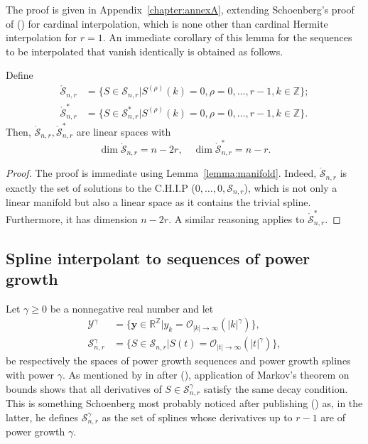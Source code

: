 The proof is given in Appendix~\ref{chapter:annexA}, extending Schoenberg's proof of (\cite[Lemma 1.1, Lecture 
4]{schoenberg_cardinal_1973-1}) for cardinal interpolation, which is none other than cardinal Hermite interpolation for 
$r=1$. An immediate corollary of this lemma for the sequences to be interpolated that vanish identically is obtained as 
follows.

\begin{lem}\label{lemma:linear-space}
  Define 
  \begin{align}\label{def:ringsplines}
    \mathring{\mathscr{S}}_{n, r} &= \{S \in \mathscr{S}_{n,r}| S^{(\rho)}(k) = 0, \rho=0, \ldots, r-1, k \in 
    \mathbb{Z}\}; \\
    \mathring{\mathscr{S}}_{n,r}^* &= \{S \in \mathscr{S}_{n,r}^*| S^{(\rho)}(k) = 0, \rho=0, \ldots, r-1, k \in 
    \mathbb{Z}\}.
  \end{align}
  Then, $\mathring{\mathscr{S}}_{n, r},  \mathring{\mathscr{S}}_{n, r}^*$ are linear spaces with
  \begin{equation}
    \dim \mathring{\mathscr{S}}_{n,r} = n-2r, \quad \dim \mathring{\mathscr{S}}_{n,r}^* = n-r.
  \end{equation}
\end{lem}

\begin{proof}
  The proof is immediate using Lemma~\ref{lemma:manifold}. Indeed, $\mathring{\mathscr{S}}_{n,r}$ is exactly the set of 
  solutions to the C.H.I.P ($0, \ldots, 0, \mathscr{S}_{n,r}$), which is not only a linear manifold but also a linear 
  space as it contains the trivial spline. Furthermore, it has dimension $n-2r$. A similar reasoning applies to 
  $\mathring{\mathscr{S}}_{n,r}^*$.
\end{proof}

\subsection{Spline interpolant to sequences of power growth}

Let $\gamma \geq 0$ be a nonnegative real number and let
\begin{align}
  \mathcal{Y}^{\gamma} &= \{\bm{y} \in \mathbb{R}^{\mathbb{Z}} | y_k = \mathcal{O}_{|k| \to \infty}({|k|}^{\gamma})\},\\
  \mathscr{S}_{n, r}^{\gamma} &= \{S \in \mathscr{S}_{n,r} | S(t) = \mathcal{O}_{|t| \to \infty}({|t|}^{\gamma})\},
\end{align}
be respectively the spaces of power growth sequences and power growth splines with power $\gamma$.  As mentioned by in 
after (\cite[(2.1)]{schoenberg_cardinal_1973-1}), application of Markov's theorem on bounds shows that all derivatives 
of $S \in \mathscr{S}_{n,r}^{\gamma}$ satisfy the same decay condition. This is something Schoenberg most probably 
noticed after publishing (\cite{lipow_cardinal_1973}) as, in the latter, he defines $\mathscr{S}_{n, r}^{\gamma}$ as the set of splines 
whose derivatives up to $r-1$ are of power growth $\gamma$. \\

